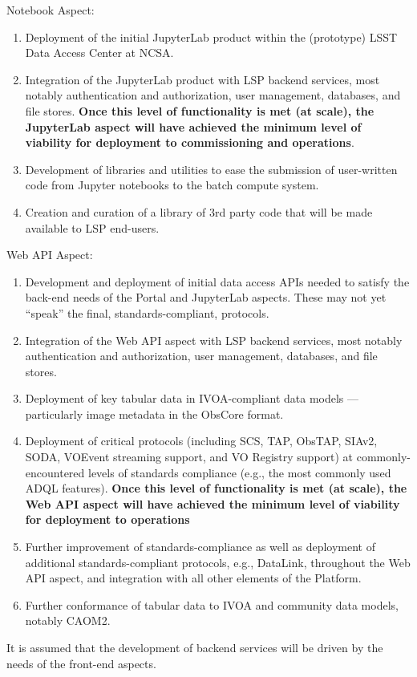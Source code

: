 Notebook Aspect:
\begin{enumerate}
	\item Deployment of the initial JupyterLab product within the (prototype) LSST Data Access Center at NCSA.
	\item Integration of the JupyterLab product with LSP backend services, most notably authentication and authorization, user management, databases, and file stores. \textbf{Once this level of functionality is met (at scale), the JupyterLab aspect will have achieved the minimum level of viability for deployment to commissioning and operations}.
	\item Development of libraries and utilities to ease the submission of user-written code from Jupyter notebooks to the batch compute system.
	\item Creation and curation of a library of 3rd party code that will be made available to LSP end-users.
\end{enumerate}

Web API Aspect:
\begin{enumerate}
	\item Development and deployment of initial data access APIs needed to satisfy the back-end needs of the Portal and JupyterLab aspects.
These may not yet ``speak'' the final, standards-compliant, protocols.
	\item Integration of the Web API aspect with LSP backend services, most notably authentication and authorization, user management, databases, and file stores.
	\item Deployment of key tabular data in IVOA-compliant data models --- particularly image metadata in the ObsCore format.
	\item Deployment of critical protocols (including SCS, TAP, ObsTAP, SIAv2, SODA, VOEvent streaming support, and VO Registry support) at commonly-encountered levels of standards compliance (e.g., the most commonly used ADQL features).
\textbf{Once this level of functionality is met (at scale), the Web API aspect will have achieved the minimum level of viability for deployment to operations}
	\item Further improvement of standards-compliance as well as deployment of additional standards-compliant protocols, e.g., DataLink, throughout the Web API aspect, and integration with all other elements of the Platform.
	\item Further conformance of tabular data to IVOA and community data models, notably CAOM2.
\end{enumerate}

It is assumed that the development of backend services will be driven by the needs of the front-end aspects.
